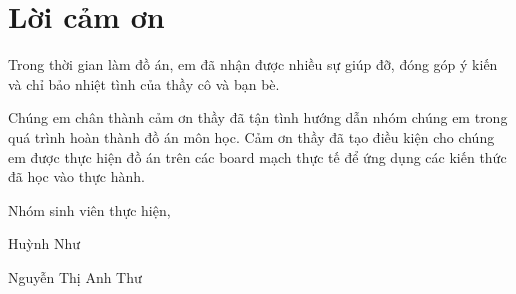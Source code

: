 \chapter*{Lời cảm ơn}

	Trong thời gian làm đồ án, em đã nhận được nhiều sự giúp đỡ, đóng góp ý kiến và chỉ bảo nhiệt tình của thầy cô và bạn bè.

	Chúng em chân thành cảm ơn thầy đã tận tình hướng dẫn nhóm chúng em trong quá trình hoàn thành đồ án môn học. Cảm ơn thầy đã tạo điều kiện cho chúng em được thực hiện đồ án trên các board mạch thực tế để ứng dụng các kiến thức đã học vào thực hành.

	\begin{flushright}
		Nhóm sinh viên thực hiện,

		Huỳnh Như \hspace*{.8cm}

		Nguyễn Thị Anh Thư \hspace*{.8cm}
	\end{flushright}
